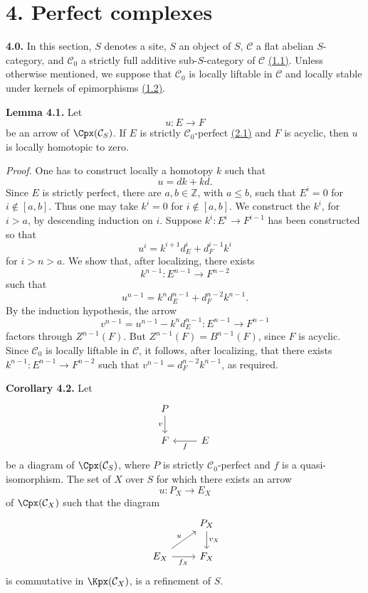 \section*{4. Perfect complexes}

\textbf{4.0.} In this section, \(S\) denotes a site, \(S\) an object of \(S\), \(\mathcal C\) a flat abelian \(S\)-category, and \(\mathcal C_0\) a strictly full additive sub-\(S\)-category of \(\mathcal C\) \hyperlink{sga6.e01.sec.1.1}{(1.1)}. Unless otherwise mentioned, we suppose that \(\mathcal C_0\) is locally liftable in \(\mathcal C\) and locally stable under kernels of epimorphisms \hyperlink{sga6.e01.sec.1.2}{(1.2)}.

\textbf{Lemma 4.1.} Let
\[
  u:E\longrightarrow F
\]
be an arrow of \(\Cpx(\mathcal C_S)\). If \(E\) is strictly \(\mathcal C_0\)-perfect \hyperlink{sga6.e01.def.2-1}{(2.1)} and \(F\) is acyclic, then \(u\) is locally homotopic to zero.

\emph{Proof.} One has to construct locally a homotopy \(k\) such that
\[
  u=dk+kd.
\]
Since \(E\) is strictly perfect, there are \(a,b\in\mathbb Z\), with \(a\leq b\), such that \(E^i=0\) for \(i\notin[a,b]\). Thus one may take \(k^i=0\) for \(i\notin[a,b]\). We construct the \(k^i\), for \(i>a\), by descending induction on \(i\). Suppose \(k^i:E^i\to F^{i-1}\) has been constructed so that
\[
  u^i=k^{i+1}d_E^i+d_F^{i-1}k^i
\]
for \(i>n>a\). We show that, after localizing, there exists
\[
  k^{n-1}:E^{n-1}\longrightarrow F^{n-2}
\]
such that
\[
  u^{n-1}=k^n d_E^{n-1}+d_F^{n-2}k^{n-1}.
\]
By the induction hypothesis, the arrow
\[
  v^{n-1}=u^{n-1}-k^n d_E^{n-1}:E^{n-1}\longrightarrow F^{n-1}
\]
factors through \(Z^{n-1}(F)\). But \(Z^{n-1}(F)=B^{n-1}(F)\), since \(F\) is acyclic. Since \(\mathcal C_0\) is locally liftable in \(\mathcal C\), it follows, after localizing, that there exists \(k^{n-1}:E^{n-1}\to F^{n-2}\) such that \(v^{n-1}=d_F^{n-2}k^{n-1}\), as required.

\textbf{Corollary 4.2.} Let
\[
\begin{tikzcd}
P \arrow[d,"v"'] \\
F & E \arrow[l,"f"]
\end{tikzcd}
\]
be a diagram of \(\Cpx(\mathcal C_S)\), where \(P\) is strictly \(\mathcal C_0\)-perfect and \(f\) is a quasi-isomorphism. The set of \(X\) over \(S\) for which there exists an arrow
\[
  u:P_X\longrightarrow E_X
\]
of \(\Cpx(\mathcal C_X)\) such that the diagram
\[
\begin{tikzcd}
& P_X \arrow[d,"v_X"]\\
E_X \arrow[r,"f_X"'] \arrow[ur,"u"] & F_X
\end{tikzcd}
\]
is commutative in \(\Kpx(\mathcal C_X)\), is a refinement of \(S\).

